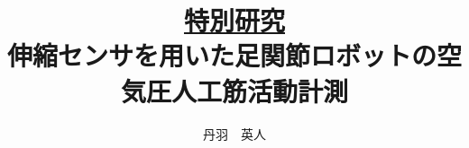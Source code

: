 {\large
\title{\Large{\underline{特別研究}}\\
\vspace{0.5cm}
伸縮センサを用いた足関節ロボットの空気圧人工筋活動計測}}
\author{丹羽　英人}
\maketitle
